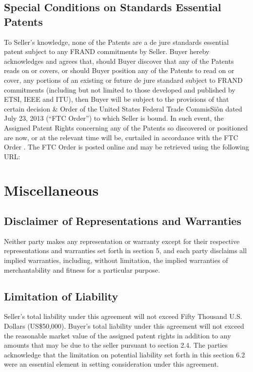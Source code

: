 \documentclass[letterpaper,10pt,english]{sphinxmanual}
\begin{document}
\subsection{Special Conditions on Standards Essential Patents}
\label{\detokenize{6-representations:special-conditions-on-standards-essential-patents}}
To Seller’s knowledge, none of the Patents are a de jure standards essential patent subject to any FRAND commitments by Seller. Buyer hereby acknowledges and agrees that, should Buyer discover that any of the Patents reads on or covers, or should Buyer position any of the Patents to read on or cover, any portions of an existing or future de jure standard subject to FRAND commitments (including but not limited to those developed and published by ETSI, IEEE and ITU), then Buyer will be subject to the provisions of that certain decision \& Order of the United States Federal Trade CommisSiôn dated July 23, 2013 (“FTC Order”) to which Seller is bound. In such event, the Assigned Patent Rights concerning any of the Patents so discovered or positioned are now, or at the relevant time will be, curtailed in accordance with the FTC Order . The FTC Order is posted online and may be retrieved using the following URL:



\section{Miscellaneous}
\label{\detokenize{7-miscellaneous:miscellaneous}}\label{\detokenize{7-miscellaneous::doc}}

\subsection{Disclaimer of Representations and Warranties}
\label{\detokenize{7-miscellaneous:disclaimer-of-representations-and-warranties}}
Neither party makes any representation or warranty except for their respective representations and warranties set forth in section 5, and each party disclaims all implied warranties, including, without limitation, the implied warranties of merchantability and fitness for a particular purpose.


\subsection{Limitation of Liability}
\label{\detokenize{7-miscellaneous:limitation-of-liability}}
Seller’s total liability under this agreement will not exceed Fifty Thousand U.S. Dollars (US\$50,000). Buyer’s total liability under this agreement will not exceed the reasonable market value of the assigned patent rights in addition to any amounts that may be due to the seller pursuant to section 2.4. The parties acknowledge that the limitation on potential liability set forth in this section 6.2 were an essential element in setting consideration under this agreement.
\end{document}
